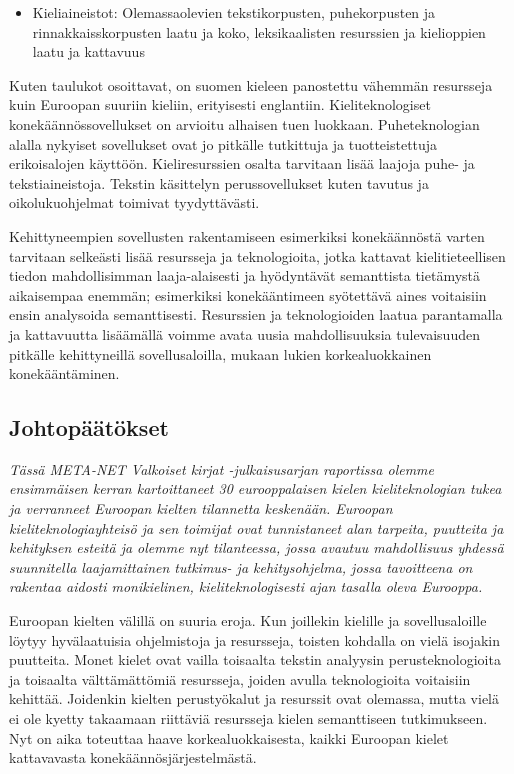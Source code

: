 \begin{multicols}{2}
\begin{itemize}
\item Kieliaineistot: Olemassaolevien tekstikorpusten, puhekorpusten ja
rinnakkaisskorpusten laatu ja koko, leksikaalisten resurssien ja
kielioppien laatu ja kattavuus
\end{itemize}

Kuten taulukot osoittavat, on suomen kieleen panostettu vähemmän resursseja kuin Euroopan suuriin kieliin, erityisesti englantiin. Kieliteknologiset konekäännössovellukset on arvioitu alhaisen tuen luokkaan. Puheteknologian alalla nykyiset sovellukset ovat jo pitkälle tutkittuja ja tuotteistettuja erikoisalojen käyttöön. Kieliresurssien osalta tarvitaan lisää laajoja puhe- ja tekstiaineistoja. Tekstin käsittelyn perussovellukset kuten tavutus ja oikolukuohjelmat toimivat tyydyttävästi.

Kehittyneempien sovellusten rakentamiseen esimerkiksi konekäännöstä varten tarvitaan selkeästi lisää resursseja ja teknologioita, jotka kattavat kielitieteellisen tiedon mahdollisimman laaja-alaisesti ja hyödyntävät semanttista tietämystä aikaisempaa enemmän; esimerkiksi konekääntimeen syötettävä aines voitaisiin ensin analysoida semanttisesti. Resurssien ja teknologioiden laatua parantamalla ja kattavuutta lisäämällä voimme avata uusia mahdollisuuksia tulevaisuuden pitkälle kehittyneillä sovellusaloilla, mukaan lukien korkealuokkainen konekääntäminen.

\subsection{Johtopäätökset}

\emph{Tässä META-NET Valkoiset kirjat -julkaisusarjan raportissa olemme ensimmäisen kerran kartoittaneet 30 eurooppalaisen kielen kieliteknologian tukea ja verranneet Euroopan kielten tilannetta keskenään. Euroopan kieliteknologiayhteisö ja sen toimijat ovat tunnistaneet alan tarpeita, puutteita ja kehityksen esteitä ja olemme nyt tilanteessa, jossa avautuu mahdollisuus yhdessä suunnitella laajamittainen tutkimus- ja kehitysohjelma, jossa tavoitteena on rakentaa aidosti monikielinen, kieliteknologisesti ajan tasalla oleva Eurooppa.}

Euroopan kielten välillä on suuria eroja. Kun joillekin kielille ja sovellusaloille löytyy hyvälaatuisia ohjelmistoja ja resursseja, toisten kohdalla on vielä isojakin puutteita. Monet kielet ovat vailla toisaalta tekstin analyysin perusteknologioita ja toisaalta välttämättömiä resursseja, joiden avulla teknologioita voitaisiin kehittää. Joidenkin kielten perustyökalut ja resurssit ovat olemassa, mutta vielä ei ole kyetty takaamaan riittäviä resursseja kielen semanttiseen tutkimukseen. Nyt on aika toteuttaa haave korkealuokkaisesta, kaikki Euroopan kielet kattavavasta konekäännösjärjestelmästä.


\end{multicols}

